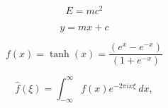 \documentclass[a4paper]{article}
\begin{document}
\begin{equation}
E=mc^2
\end{equation}

$$y=mx+c$$

\begin{equation}
f(x)=\tanh (x) = \frac{(e^{x}-e^{-x})}{(1+e^{-x})}
\end{equation}

\begin{equation}
\hat{f}(\xi)=\int_{-\infty}^{\infty}f(x)e^{-2\pi ix\xi}\ dx,
\end{equation}
\end{document}
